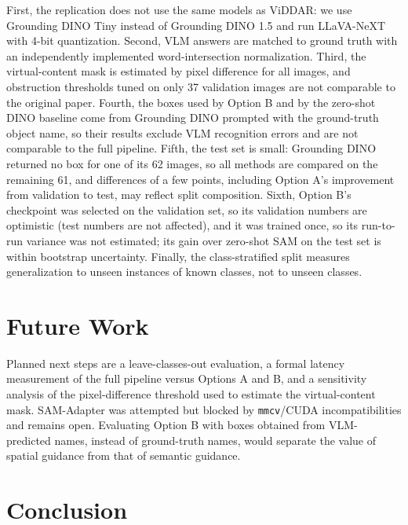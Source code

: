 \documentclass[conference]{IEEEtran}
\begin{document}
First, the replication does not use the same models as ViDDAR: we use Grounding DINO Tiny instead of Grounding DINO 1.5 and run LLaVA-NeXT with 4-bit quantization. Second, VLM answers are matched to ground truth with an independently implemented word-intersection normalization. Third, the virtual-content mask is estimated by pixel difference for all images, and obstruction thresholds tuned on only 37 validation images are not comparable to the original paper. Fourth, the boxes used by Option B and by the zero-shot DINO baseline come from Grounding DINO prompted with the ground-truth object name, so their results exclude VLM recognition errors and are not comparable to the full pipeline. Fifth, the test set is small: Grounding DINO returned no box for one of its 62 images, so all methods are compared on the remaining 61, and differences of a few points, including Option A's improvement from validation to test, may reflect split composition. Sixth, Option B's checkpoint was selected on the validation set, so its validation numbers are optimistic (test numbers are not affected), and it was trained once, so its run-to-run variance was not estimated; its gain over zero-shot SAM on the test set is within bootstrap uncertainty. Finally, the class-stratified split measures generalization to unseen instances of known classes, not to unseen classes.


\section{Future Work}

Planned next steps are a leave-classes-out evaluation, a formal latency measurement of the full pipeline versus Options A and B, and a sensitivity analysis of the pixel-difference threshold used to estimate the virtual-content mask. SAM-Adapter was attempted but blocked by \texttt{mmcv}/CUDA incompatibilities and remains open. Evaluating Option B with boxes obtained from VLM-predicted names, instead of ground-truth names, would separate the value of spatial guidance from that of semantic guidance.


\section{Conclusion}
\end{document}

